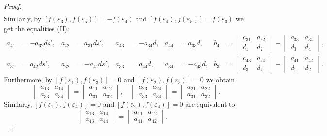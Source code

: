 \documentclass[10pt,a4paper]{amsart}
\begin{document}
\begin{proof}
\begin{align*}
\end{align*}
Similarly, by $[f(\varepsilon_3),f(\varepsilon_5)]=- f(\varepsilon_4)$ and $[f(\varepsilon_4),f(\varepsilon_5)]=f(\varepsilon_3)$ we get
the equalities (II):
\begin{align*}
a_{41}&=-a_{32}ds',& a_{42}&=a_{31}ds',& a_{43}&=-a_{34}d, & a_{44}&=a_{33}d,
& b_4&=\begin{vmatrix}a_{31} & a_{32} \\ d_1 & d_2 \end{vmatrix}-\begin{vmatrix}a_{33} & a_{34} \\ d_3 & d_4 \end{vmatrix},\\
a_{31}&=a_{42}ds',& a_{32}&=-a_{41}ds', & a_{33}&=a_{44}d,& a_{34}&=-a_{43}d,
& b_3&=\begin{vmatrix}a_{43} & a_{44} \\ d_3 & d_4 \end{vmatrix}-\begin{vmatrix}a_{41} & a_{42} \\ d_1 & d_2 \end{vmatrix}.
\end{align*}
Furthermore, by $[f(\varepsilon_1),f(\varepsilon_3)]=0$ and $[f(\varepsilon_2),f(\varepsilon_3)]=0$ we obtain
\begin{equation}\label{bck_1323}
\begin{vmatrix}a_{13} & a_{14} \\ a_{33} & a_{34} \end{vmatrix}=\begin{vmatrix}a_{11} & a_{12} \\ a_{31} & a_{32} \end{vmatrix},\quad
\begin{vmatrix}a_{23} & a_{24} \\ a_{33} & a_{34} \end{vmatrix}=\begin{vmatrix}a_{21} & a_{22} \\ a_{31} & a_{32} \end{vmatrix}.
\end{equation}
Similarly, $[f(\varepsilon_1),f(\varepsilon_4)]=0$ and $[f(\varepsilon_2),f(\varepsilon_4)]=0$ are equivalent to
\begin{equation}\label{bck_1424}
\begin{vmatrix}a_{13} & a_{14} \\ a_{43} & a_{44} \end{vmatrix}=\begin{vmatrix}a_{11} & a_{12} \\ a_{41} & a_{42} \end{vmatrix},\quad

\end{equation}
\end{proof}
\end{document}
